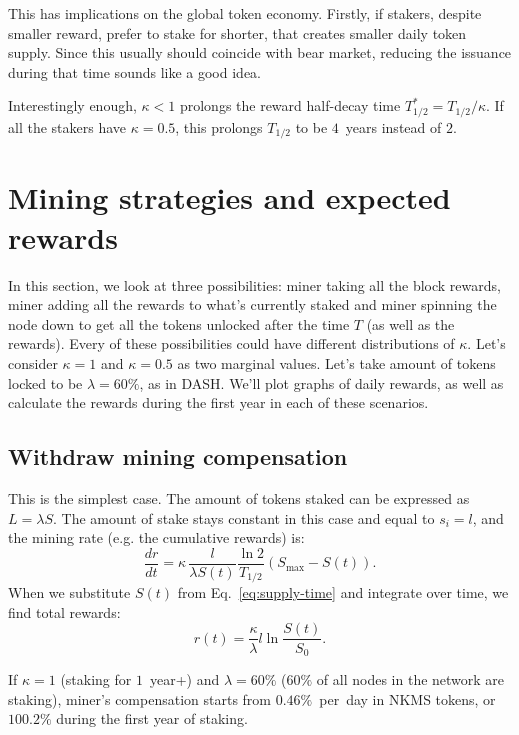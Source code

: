 \documentclass[longbibliography,nofootinbib,twocolumn]{revtex4-1}
\begin{document}
This has implications on the global token economy.
Firstly, if stakers, despite smaller reward, prefer to stake for shorter, that creates smaller daily token supply.
Since this usually should coincide with bear market, reducing the issuance during that time sounds like a good idea.

Interestingly enough, $\kappa < 1$ prolongs the reward half-decay time $T_{1/2}^* = T_{1/2} / \kappa$.
If all the stakers have $\kappa = 0.5$, this prolongs $T_{1/2}$ to be $4$~years instead of $2$.

\section{Mining strategies and expected rewards}

In this section, we look at three possibilities: miner taking all the block rewards, miner adding all the rewards to what's currently staked and miner spinning
the node down to get all the tokens unlocked after the time $T$ (as well as the rewards).
Every of these possibilities could have different distributions of $\kappa$.
Let's consider $\kappa=1$ and $\kappa=0.5$ as two marginal values.
Let's take amount of tokens locked to be $\lambda=60\%$, as in DASH.
We'll plot graphs of daily rewards, as well as calculate the rewards during the first year in each of these scenarios.

\subsection{Withdraw mining compensation}

This is the simplest case.
The amount of tokens staked can be expressed as $L=\lambda S$.
The amount of stake stays constant in this case and equal to $s_i = l$, and the mining rate (e.g. the cumulative rewards) is:
\begin{equation}
    \frac{dr}{dt} =  \kappa\, \frac{l}{\lambda S(t)} \frac{\ln{2}}{T_{1/2}} \left( S_{\max} - S(t)\right).
\end{equation}
When we substitute $S(t)$ from Eq.~\ref{eq:supply-time} and integrate over time, we find total rewards:
\begin{equation}
    r(t) = \frac{\kappa}{\lambda} l \ln\frac{S(t)}{S_0}.
\end{equation}

If $\kappa=1$ (staking for $1$~year+) and $\lambda=60\%$ ($60\%$ of all nodes in the network are staking),
miner's compensation starts from $0.46\%$~per~day in NKMS tokens,
or $100.2\%$ during the first year of staking.
\end{document}

